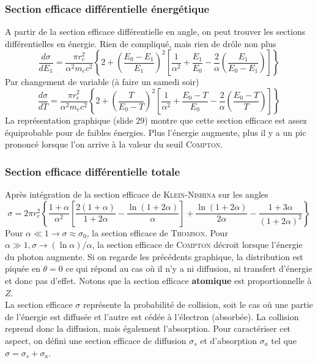 \subsubsection{Section efficace différentielle énergétique}%
A partir de la section efficace différentielle en angle, on peut trouver les sections différentielles
en énergie. Rien de compliqué, mais rien de drôle non plus
\begin{equation}
\frac{d\sigma}{dE_1}=\frac{\pi r_e^2}{\alpha^2m_ec^2}\left\{2+\left(\frac{E_0-E_1}{E_1}\right)^2\left[\frac{1}{\alpha^2}+\frac{E_1}{E_0}-\frac{2}{\alpha}\left(\frac{E_1}{E_0-E_1}\right) \right]\right\}
\end{equation}
Par changement de variable (à faire un samedi soir)
\begin{equation}
\frac{d\sigma}{dT}=\frac{\pi r_e^2}{\alpha^2m_ec^2}\left\{2+\left(\frac{T}{E_0-T}\right)^2\left[\frac{1}{\alpha^2}+\frac{E_0-T}{E_0}-\frac{2}{\alpha}\left(\frac{E_0-T}{T}\right) \right]\right\}
\end{equation}
La représentation graphique (slide 29) montre que cette section efficace est assez équiprobable pour
de faibles énergies. Plus l'énergie augmente, plus il y a un pic prononcé lorsque l'on arrive à
la valeur du seuil \textsc{Compton}.

\subsubsection{Section efficace différentielle totale}%
Après intégration de la section efficace de \textsc{Klein-Nishina} sur les angles
\begin{equation}
\sigma=2\pi r_e^2\left\{\frac{1+\alpha}{\alpha^2}\left[\frac{2(1+\alpha)}{1+2\alpha}-\frac{\ln{(1+2\alpha)}}{\alpha}\right]+\frac{\ln{(1+2\alpha)}}{2\alpha}-\frac{1+3\alpha}{(1+2\alpha)^2}\right\}
\end{equation}
Pour $\alpha\ll 1 \to \sigma \approx \sigma_0$, la section efficace de \textsc{Thomson}. Pour
$\alpha\gg 1, \sigma  \to (\ln\alpha)/\alpha$, la section efficace de \textsc{Compton} décroit
lorsque l'énergie du photon augmente. Si on regarde les précédents graphique, la distribution
est piquée en $\theta=0$ ce qui répond au cas où il n'y a ni diffusion, ni transfert d'énergie et
donc pas d'effet. Notons que la section efficace \textbf{atomique} est proportionnelle à $Z$.\\

La section efficace $\sigma$ représente la probabilité de collision, soit le cas où une partie de
l'énergie est diffusée et l'autre est cédée à l'électron (absorbée). La collision reprend donc 
la diffusion, mais également l'absorption. Pour caractériser cet aspect, on défini une section
efficace de diffusion $\sigma_s$ et d'absorption $\sigma_a$ tel que $\sigma = \sigma_s+\sigma_a$.



